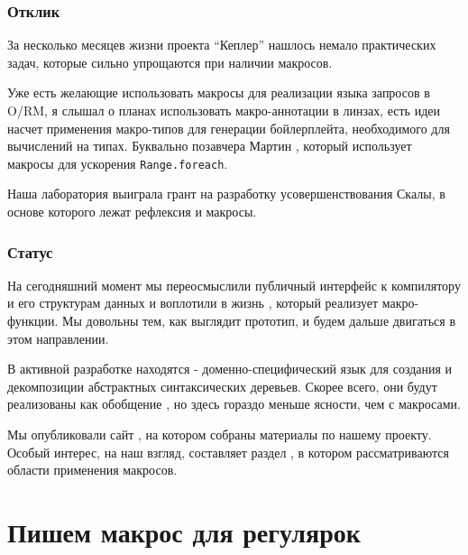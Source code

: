 \documentclass[hyperref={bookmarks=false}]{beamer}
\begin{document}
\begin{frame}[t,fragile]
\frametitle{Отклик}

За несколько месяцев жизни проекта ``Кеплер'' нашлось немало практических задач, которые сильно упрощаются при наличии макросов.

Уже есть желающие использовать макросы для реализации языка запросов в O/RM, я слышал о планах использовать макро-аннотации в линзах, есть идеи насчет применения макро-типов для генерации бойлерплейта, необходимого для вычислений на типах. Буквально позавчера Мартин , который использует макросы для ускорения \texttt{Range.foreach}.

Наша лаборатория выиграла грант  на разработку усовершенствования Скалы, в основе которого лежат рефлексия и макросы.
\end{frame}

\begin{frame}[t,fragile]
\frametitle{Статус}

На сегодняшний момент мы переосмыслили публичный интерфейс к компилятору и его структурам данных и воплотили в жизнь , который реализует макро-функции. Мы довольны тем, как выглядит прототип, и будем дальше двигаться в этом направлении.

В активной разработке находятся  - доменно-специфический язык для создания и декомпозиции абстрактных синтаксических деревьев. Скорее всего, они будут реализованы как обобщение , но здесь гораздо меньше ясности, чем с макросами.

Мы опубликовали сайт , на котором собраны материалы по нашему проекту. Особый интерес, на наш взгляд, составляет раздел , в котором рассматриваются области применения макросов.
\end{frame}

\section{Пишем макрос для регулярок}
\end{document}

